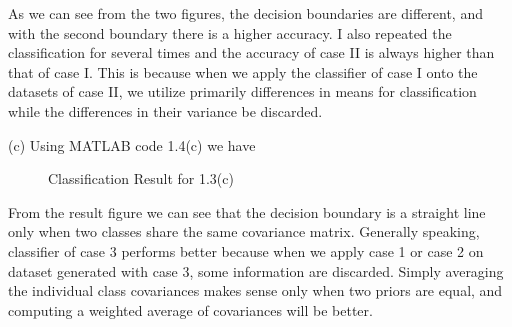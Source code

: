 \documentclass[12pt]{article}
\begin{document}
\noindent As we can see from the two figures, the decision boundaries are different, and with the second boundary there is a higher accuracy. I also repeated the classification for several times and the accuracy of case II is always higher than that of case I. This is because when we apply the classifier of case I onto the datasets of case II, we utilize primarily differences in means for classification while the differences in their variance be discarded.\\

\vfill
\clearpage

(c) Using MATLAB code 1.4(c) we have
\begin{figure}[H]
\centering
{}%
%

\caption{Classification Result for 1.3(c)}
\end{figure}
\noindent From the result figure we can see that the decision boundary is a straight line only when two classes share the same covariance matrix. Generally speaking, classifier of case 3 performs better because when we apply case 1 or case 2 on dataset generated with case 3, some information are discarded. Simply averaging the individual class covariances makes sense only when two priors are equal, and computing a weighted average of covariances will be better.
\end{document}
